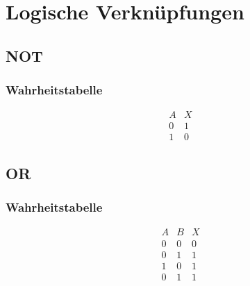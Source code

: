 



\section{Logische Verknüpfungen}

\subsection{NOT}
\subsubsection{Wahrheitstabelle}
\begin{table}[h!]
\[ \begin{array}{c|c}
A&X\\
\hline
0&1\\
1&0
\end{array} \]
\end{table}

\subsection{OR}
\subsubsection{Wahrheitstabelle}
\begin{table}[h!]
\[ \begin{array}{cc|c}
A&B&X\\
\hline
0&0&0\\
0&1&1\\
1&0&1\\
0&1&1\\
\end{array} \]
\end{table}


